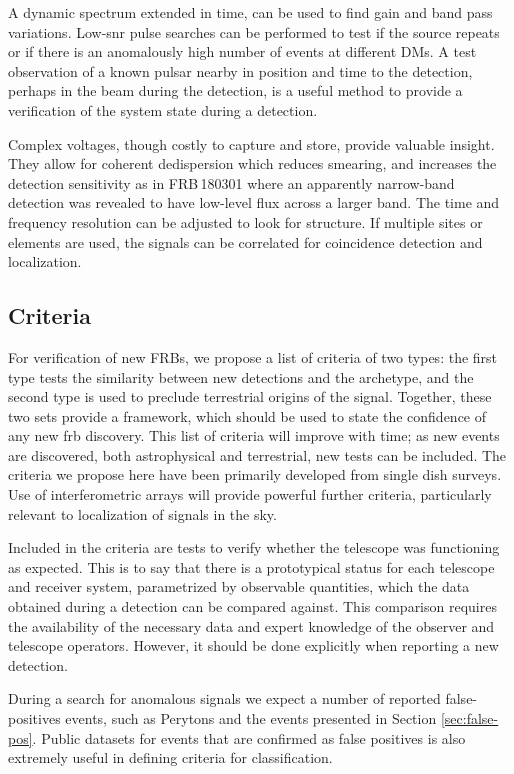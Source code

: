 \documentclass[a4paper,fleqn,usenatbib]{mnras}
\begin{document}
A dynamic spectrum extended in time, can be used to find gain and band pass
variations. Low-\gls{snr} pulse searches can be performed to test if the source
repeats or if there is an anomalously high number of events at different DMs.  A
test observation of a known pulsar nearby in position and time to the detection,
perhaps in the beam during the detection, is a useful method to provide a
verification of the system state during a detection.

Complex voltages, though costly to capture and store, provide valuable insight.
They allow for coherent dedispersion which reduces smearing, and increases the
detection sensitivity as in FRB\,180301 \citep{atel11376} where an apparently
narrow-band detection was revealed to have low-level flux across a larger band.
The time and frequency resolution can be adjusted to look for structure. If
multiple sites or elements are used, the signals can be correlated for
coincidence detection and localization.

\subsection{Criteria}
\label{sec:criteria}

For verification of new FRBs, we propose a list of criteria of two types: the
first type tests the similarity between new detections and the archetype, and the
second type is used to preclude terrestrial origins of the signal. Together,
these two sets provide a framework, which should be used to state the confidence
of any new \gls{frb} discovery. This list of criteria will improve with time; as
new events are discovered, both astrophysical and terrestrial, new tests can be
included. The criteria we propose here have been primarily developed from single
dish surveys.  Use of interferometric arrays will provide powerful further
criteria, particularly relevant to localization of signals in the sky.

Included in the criteria are tests to verify whether the telescope was
functioning as expected. This is to say that there is a prototypical status for
each telescope and receiver system, parametrized by observable quantities, which
the data obtained during a detection can be compared against.  This comparison
requires the availability of the necessary data and expert knowledge of the
observer and telescope operators. However, it should be done explicitly when
reporting a new detection.

During a search for anomalous signals we expect a number of reported
false-positives events, such as Perytons \citep{2011ApJ...727...18B} and the
events presented in Section \ref{sec:false-pos}.  Public datasets for events
that are confirmed as false positives is also extremely useful in defining
criteria for classification. 
\end{document}

